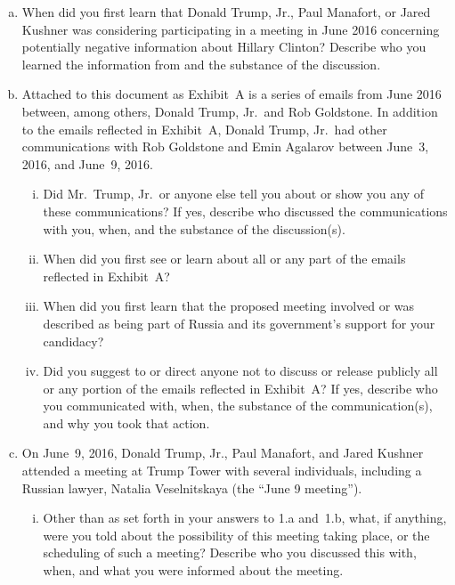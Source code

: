 \begin{enumerate}[a.]

\item When did you first learn that Donald Trump, Jr., Paul Manafort, or Jared Kushner was considering participating in a meeting in June 2016 concerning potentially negative information about Hillary Clinton?
Describe who you learned the information from and the substance of the discussion.

\item Attached to this document as Exhibit~A is a series of emails from June 2016 between, among others, Donald Trump, Jr.\ and Rob Goldstone.
In addition to the emails reflected in Exhibit~A, Donald Trump, Jr.\ had other communications with Rob Goldstone and Emin Agalarov between June~3, 2016, and June~9, 2016.

\begin{enumerate}[i.]

\item Did Mr.~Trump, Jr.\ or anyone else tell you about or show you any of these communications?
If yes, describe who discussed the communications with you, when, and the substance of the discussion(s).

\item When did you first see or learn about all or any part of the emails reflected in Exhibit~A?

\item When did you first learn that the proposed meeting involved or was described as being part of Russia and its government's support for your candidacy?

\item Did you suggest to or direct anyone not to discuss or release publicly all or any portion of the emails reflected in Exhibit~A? If yes, describe who you communicated with, when, the substance of the communication(s), and why you took that action.

\end{enumerate}

\item On June~9, 2016, Donald Trump, Jr., Paul Manafort, and Jared Kushner attended a meeting at Trump Tower with several individuals, including a Russian lawyer, Natalia Veselnitskaya (the ``June 9 meeting'').

\begin{enumerate}[i.]

\item Other than as set forth in your answers to 1.a and~1.b, what, if anything, were you told about the possibility of this meeting taking place, or the scheduling of such a meeting?
Describe who you discussed this with, when, and what you were informed about the meeting.


\end{enumerate}
\end{enumerate}
